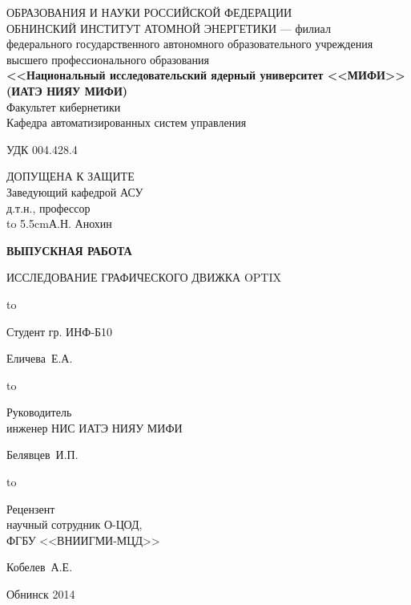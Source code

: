 \begin{titlepage}
\newpage

\begin{center}
{\small{} ОБРАЗОВАНИЯ И НАУКИ РОССИЙСКОЙ ФЕДЕРАЦИИ\\
ОБНИНСКИЙ ИНСТИТУТ АТОМНОЙ ЭНЕРГЕТИКИ --- филиал}\\
федерального государственного автономного образовательного учреждения\\
высшего профессионального образования\\
{\bf<<Национальный исследовательский ядерный университет <<МИФИ>>\\
(ИАТЭ НИЯУ МИФИ)}\\
\vspace{2em}
Факультет кибернетики\\
Кафедра автоматизированных систем управления
\end{center}
\vspace{2em}
УДК 004.428.4
\hfill
\parbox{5.5cm}
{
ДОПУЩЕНА К ЗАЩИТЕ\\
Заведующий кафедрой АСУ\\
д.т.н., профессор\\
\hbox to 5.5cm{\dotfill А.Н. Анохин}
}
\vspace{5em}
\begin{center}
\textbf{ВЫПУСКНАЯ РАБОТА}
\end{center}


\begin{center}
ИССЛЕДОВАНИЕ ГРАФИЧЕСКОГО ДВИЖКА OPTIX
\end{center}

\vspace{6em}

\hbox to \textwidth
{\parbox{6 cm}{Студент гр. ИНФ-Б10}\dotfill \parbox{4 cm}{
\begin{flushright}Еличева~Е.А.\end{flushright}}}
\vspace{2em}

\hbox to \textwidth
{\parbox{6 cm}{Руководитель\\инженер НИС ИАТЭ НИЯУ МИФИ}\dotfill \parbox{4 cm}{
\begin{flushright}Белявцев~И.П.\end{flushright}}}
\vspace{2em}

\hbox to \textwidth
{\parbox{6 cm}{Рецензент\\ научный сотрудник О-ЦОД, \\
ФГБУ <<ВНИИГМИ-МЦД>>}\dotfill \parbox{4 cm}{
\begin{flushright}Кобелев~А.Е.\end{flushright}}}

\vspace{\fill}

\begin{center}
Обнинск 2014
\end{center}

\end{titlepage}